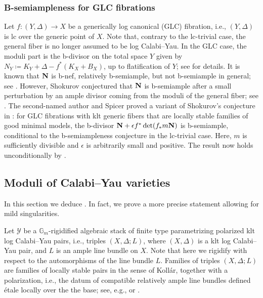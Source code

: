 \documentclass{amsart}
\theoremstyle{definition}
\theoremstyle{remark}
\def\cY{\mathcal{Y}}
\newcommand\bfN{{\bf N}}
\numberwithin{equation}{section}
\begin{document}
\subsubsection{B-semiampleness for GLC fibrations}\label{GLC} Let $f \colon (Y, \Delta) \to X$ be a generically log canonical (GLC) fibration, i.e., $(Y, \Delta)$ is lc over the generic point of $X$.
Note that, contrary to the lc-trivial case, the general fiber is no longer assumed to be log Calabi--Yau. In the GLC case, the moduli part is the  b-divisor on the total space $Y$ given by $N_Y \coloneqq K_Y + \Delta - f^*(K_{X}+B_X)$, up to flatification of $Y$; see \cite[\S 2.2]{ACSS2021} for details.
It is known that $\bfN$ is  b-nef, relatively  b-semiample, but not  b-semiample in general; see \cite{ACSS2021}.
However, Shokurov conjectured that $\bfN$ is  b-semiample after a small perturbation by an ample divisor coming from the moduli of the general fiber; see \cite[Conj.~1]{shokurov2021logadjunctionmoduli}.
The second-named author and Spicer proved a variant of Shokurov's conjecture in \cite[Thm.~1.2]{FS22}: for 
GLC fibrations with klt generic fibers that are locally stable families of good minimal models,
the  b-divisor $\bfN+ \epsilon f^* \det(f_* m\bfN)$ is  b-semiample, conditional to the  b-semiampleness conjecture in the lc-trivial case.
Here, $m$ is sufficiently divisible and $\epsilon$ is arbitrarily small and positive.
The result now holds unconditionally by . 



\subsection{Moduli of Calabi--Yau varieties}\label{sec:moduli} In this section we deduce .  In fact, we prove a more precise statement allowing for mild singularities.

Let $\cY$ be a $\mathbb{G}_m$-rigidified 
algebraic stack of finite type  parametrizing  polarized klt log Calabi--Yau pairs, i.e., triples $(X,\Delta;L)$, where $(X,\Delta)$ is a klt log Calabi--Yau pair, and $L$ is an ample line bundle on $X$. Note that here we rigidify with respect to the automorphisms of the line bundle $L$. Families of triples $(X,\Delta;L)$ are families of locally stable pairs in the sense of Koll\'ar, together with a polarization, i.e., the datum of compatible relatively ample line bundles defined \'etale locally over the the base; see, e.g., \cite[\S 4.2]{AH2011} or \cite[Def.~8.40]{kbook}.
\end{document}
